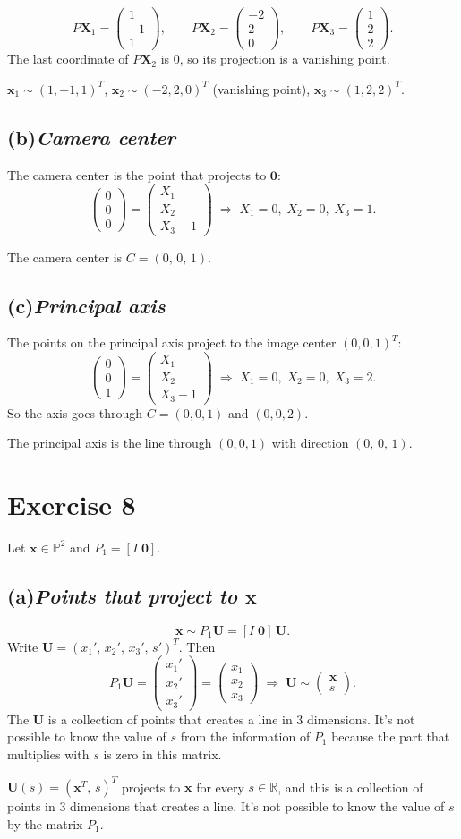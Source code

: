\documentclass[11pt,a4paper]{article}
\newcommand{\vb}[1]{\mathbf{#1}}
\newcommand{\vect}[1]{
    \begin{pmatrix}#1
\end{pmatrix}}
\newcommand{\PP}{\mathbb{P}}
\newcommand{\RR}{\mathbb{R}}
\newcommand{\exercise}[1]{
\section*{Exercise #1}}
\newcommand{\task}[2]{
\subsection*{#1\quad\normalfont\textit{#2}}}
\begin{document}
\[
    P\vb{X}_1 = \vect{1\\-1\\1},\qquad
    P\vb{X}_2 = \vect{-2\\2\\0},\qquad
    P\vb{X}_3 = \vect{1\\2\\2}.
\]
The last coordinate of $P\vb{X}_2$ is $0$, so its projection is a
vanishing point.
\begin{answer}
    $\vb{x}_1 \sim (1,-1,1)^T$, \quad $\vb{x}_2 \sim (-2,2,0)^T$
    (vanishing point), \quad $\vb{x}_3 \sim (1,2,2)^T$.
\end{answer}

\task{(b)}{Camera center}

The camera center is the point that projects to $\vb{0}$:
\[
    \vect{0\\0\\0} = \vect{X_1\\X_2\\X_3-1}
    \;\Longrightarrow\; X_1 = 0,\; X_2 = 0,\; X_3 = 1.
\]
\begin{answer}
    The camera center is $C = (0,\,0,\,1)$.
\end{answer}

\task{(c)}{Principal axis}

The points on the principal axis project to the image center $(0,0,1)^T$:
\[
    \vect{0\\0\\1} = \vect{X_1\\X_2\\X_3-1}
    \;\Longrightarrow\; X_1 = 0,\; X_2 = 0,\; X_3 = 2.
\]
So the axis goes through $C=(0,0,1)$ and $(0,0,2)$.
\begin{answer}
    The principal axis is the line through $(0,0,1)$ with direction
    $(0,\,0,\,1)$.
\end{answer}

\exercise{8}

Let $\vb{x} \in \PP^2$ and $P_1 = [I\;\vb{0}]$.

\task{(a)}{Points that project to $\vb{x}$}

\[
    \vb{x} \sim P_1\vb{U} = [I\;\vb{0}]\,\vb{U}.
\]
Write $\vb{U} = (x_1',\,x_2',\,x_3',\,s')^T$. Then
\[
    P_1\vb{U} = \vect{x_1'\\x_2'\\x_3'} = \vect{x_1\\x_2\\x_3}
    \;\Longrightarrow\;
    \vb{U} \sim \vect{\vb{x}\\ s}.
\]
The $\vb{U}$ is a collection of points that creates a line in 3 dimensions.
It's not possible to know the value of $s$ from the information of
$P_1$ because the part that multiplies with $s$ is zero in this matrix.
\begin{answer}
    $\vb{U}(s) = (\vb{x}^T,\, s)^T$ projects to $\vb{x}$ for
    every $s \in \RR$, and this is a collection of points in 3
    dimensions that creates a line. It's not possible to know the
    value of $s$ by the matrix $P_1$.
\end{answer}
\end{document}
